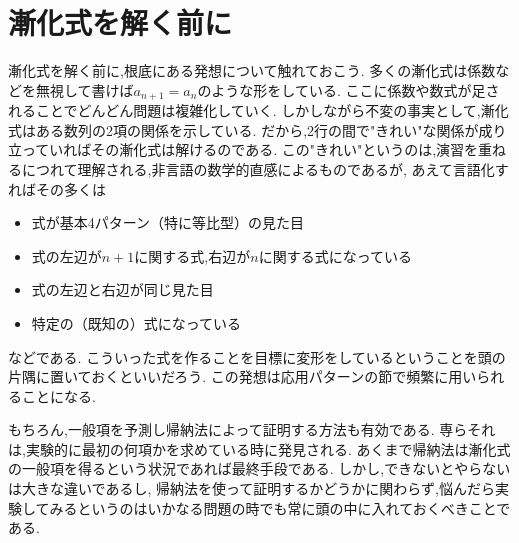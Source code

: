 
\section{漸化式を解く前に}\label{sec:before}\label{節：漸化式を解く前に}
  漸化式を解く前に,根底にある発想について触れておこう.
  多くの漸化式は係数などを無視して書けば$a_{n+1}=a_n$のような形をしている.
  ここに係数や数式が足されることでどんどん問題は複雑化していく.
  しかしながら不変の事実として,漸化式はある数列の2項の関係を示している.
  だから,2行の間で"きれい"な関係が成り立っていればその漸化式は解けるのである.
  この"きれい"というのは,演習を重ねるにつれて理解される,非言語の数学的直感によるものであるが,
  あえて言語化すればその多くは
  \begin{itemize}
    \item 式が基本4パターン（特に等比型）の見た目
    \item 式の左辺が$n+1$に関する式,右辺が$n$に関する式になっている
    \item 式の左辺と右辺が同じ見た目
    \item 特定の（既知の）式になっている
  \end{itemize}
  などである.
  こういった式を作ることを目標に変形をしているということを頭の片隅に置いておくといいだろう.
  この発想は応用パターンの節で頻繁に用いられることになる.

  もちろん,一般項を予測し帰納法によって証明する方法も有効である.
  専らそれは,実験的に最初の何項かを求めている時に発見される.
  あくまで帰納法は漸化式の一般項を得るという状況であれば最終手段である.
  しかし,できないとやらないは大きな違いであるし,
  帰納法を使って証明するかどうかに関わらず,悩んだら実験してみるというのはいかなる問題の時でも常に頭の中に入れておくべきことである.
